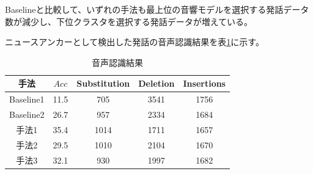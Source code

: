 Baselineと比較して、いずれの手法も最上位の音響モデルを選択する発話データ数が減少し、下位クラスタを選択する発話データが増えている。\\

ニュースアンカーとして検出した発話の音声認識結果を表\ref{table:result_sprecog2}に示す。

\begin{table}[H]
  \begin{center}
    \caption{音声認識結果 \label{table:result_sprecog2}}
    \begin{tabular}{|c||c|c|c|c|} \hline
     手法  & $Acc$ & Substitution & Deletion & Insertions \\ \hline
     Baseline1 & 11.5 & 705 & 3541 & 1756 \\ \hline
     Baseline2 & 26.7 & 957 & 2334 & 1684 \\ \hline
     手法1  & 35.4 & 1014 & 1711 & 1657 \\ \hline
     手法2  & 29.5 & 1010 & 2104  & 1670 \\ \hline  
     手法3  & 32.1 & 930 & 1997 & 1682 \\ \hline
    \end{tabular}
  \end{center}
\end{table}


